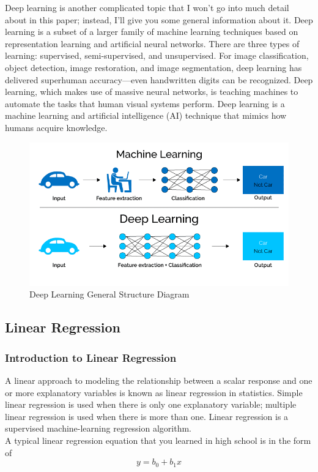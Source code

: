 Deep learning is another complicated topic that I won't go into much detail about in this paper; instead, I'll give you some general information about it. Deep learning is a subset of a larger family of machine learning techniques based on representation learning and artificial neural networks. There are three types of learning: supervised, semi-supervised, and unsupervised. For image classification, object detection, image restoration, and image segmentation, deep learning has delivered superhuman accuracy—even handwritten digits can be recognized. Deep learning, which makes use of massive neural networks, is teaching machines to automate the tasks that human visual systems perform. Deep learning is a machine learning and artificial intelligence (AI) technique that mimics how humans acquire knowledge.

\begin{figure}[H]
    \includegraphics[width=\linewidth]{images/deeplearningdiagram.png}
    \caption{Deep Learning General Structure Diagram}
    \label{fig:deeplearningexplained}
\end{figure}

\subsection{Linear Regression}
\subsubsection{Introduction to Linear Regression}

A linear approach to modeling the relationship between a scalar response and one or more explanatory variables is known as linear regression in statistics. Simple linear regression is used when there is only one explanatory variable; multiple linear regression is used when there is more than one. 
Linear regression is a supervised machine-learning regression algorithm. \\
A typical linear regression equation that you learned in high school is in the form of
\begin{equation}
y = b_0 + b_1 x
\end{equation}

